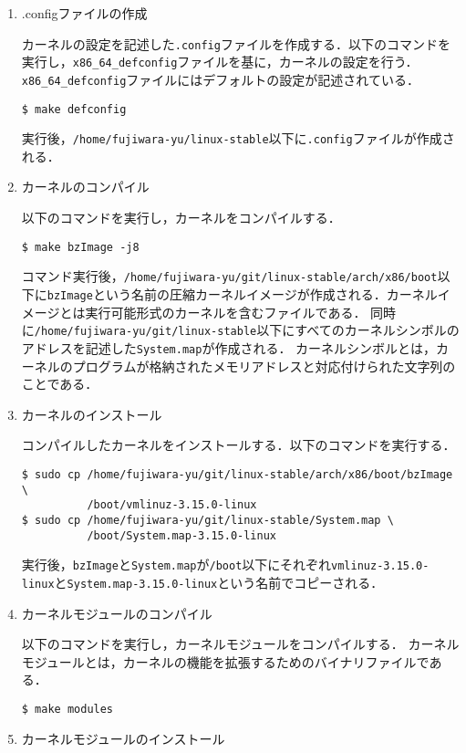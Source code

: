 \documentclass[12pt]{jsarticle}
\begin{document}
\begin{enumerate}
\item .configファイルの作成

カーネルの設定を記述した\verb|.config|ファイルを作成する．以下のコマンドを実行し，\verb|x86_64_defconfig|ファイルを基に，カーネルの設定を行う．\verb|x86_64_defconfig|ファイルにはデフォルトの設定が記述されている．
\begin{verbatim}
$ make defconfig
\end{verbatim}
実行後，\verb|/home/fujiwara-yu/linux-stable|以下に\verb|.config|ファイルが作成される．

\item カーネルのコンパイル

以下のコマンドを実行し，カーネルをコンパイルする．
\begin{verbatim}
$ make bzImage -j8
\end{verbatim}
コマンド実行後，\verb|/home/fujiwara-yu/git/linux-stable/arch/x86/boot|以下に\verb|bzImage|という名前の圧縮カーネルイメージが作成される．カーネルイメージとは実行可能形式のカーネルを含むファイルである．
同時に\verb|/home/fujiwara-yu/git/linux-stable|以下にすべてのカーネルシンボルのアドレスを記述した\verb|System.map|が作成される．
カーネルシンボルとは，カーネルのプログラムが格納されたメモリアドレスと対応付けられた文字列のことである．

\item カーネルのインストール

コンパイルしたカーネルをインストールする．以下のコマンドを実行する．
\begin{verbatim}
$ sudo cp /home/fujiwara-yu/git/linux-stable/arch/x86/boot/bzImage \
          /boot/vmlinuz-3.15.0-linux
$ sudo cp /home/fujiwara-yu/git/linux-stable/System.map \
          /boot/System.map-3.15.0-linux
\end{verbatim}
実行後，\verb|bzImage|と\verb|System.map|が\verb|/boot|以下にそれぞれ\verb|vmlinuz-3.15.0-linux|と\verb|System.map-3.15.0-linux|という名前でコピーされる．

\item カーネルモジュールのコンパイル

以下のコマンドを実行し，カーネルモジュールをコンパイルする．
カーネルモジュールとは，カーネルの機能を拡張するためのバイナリファイルである．
\begin{verbatim}
$ make modules
\end{verbatim}

\item カーネルモジュールのインストール


\end{enumerate}
\end{document}
